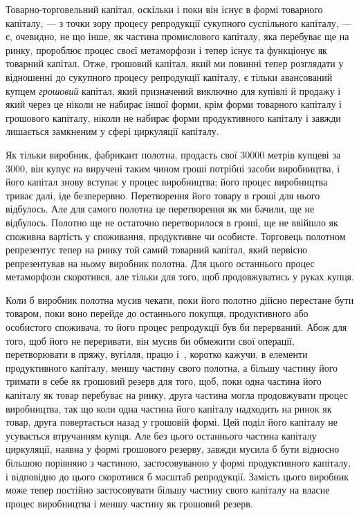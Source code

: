 Товарно-торговельний капітал, оскільки і поки він існує в формі
товарного капіталу, — з точки зору процесу репродукції сукупного суспільного капіталу, — є,
очевидно, не що інше, як
частина промислового капіталу, яка перебуває ще на ринку,
пророблює процес своєї метаморфози і тепер існує та функціонує як товарний капітал. Отже, грошовий
капітал, який ми
повинні тепер розглядати у відношенні до сукупного процесу
репродукції капіталу, є тільки авансований купцем \emph{грошовий}
капітал, який призначений виключно для купівлі й продажу
і який через це ніколи не набирає іншої форми, крім форми товарного капіталу і грошового капіталу,
ніколи не набирає форми
продуктивного капіталу і завжди лишається замкненим у сфері
циркуляції капіталу.

Як тільки виробник, фабрикант полотна, продасть свої \num{30000}
метрів купцеві за 3000, він купує на виручені таким чином гроші потрібні засоби
виробництва, і його капітал
знову вступає у процес виробництва; його процес виробництва
триває далі, іде безперервно. Перетворення його товару в гроші
для нього відбулось. Але для самого полотна це перетворення
як ми бачили, ще не відбулось. Полотно ще не остаточно перетворилося
в гроші, ще не ввійшло як споживна вартість у споживання,
продуктивне чи особисте. Торговець полотном репрезентує
тепер на ринку той самий товарний капітал, який первісно
репрезентував на ньому виробник полотна. Для цього
останнього процес метаморфози скоротився, але тільки для того,
щоб продовжуватись у руках купця.

Коли б виробник полотна мусив чекати, поки його полотно
дійсно перестане бути товаром, поки воно перейде до останнього
покупця, продуктивного або особистого споживача, то
його процес репродукції був би перерваний. Абож для того, щоб
його не переривати, він мусив би обмежити свої операції, перетворювати
в пряжу, вугілля, працю і~, коротко кажучи,
в елементи продуктивного капіталу, меншу частину свого полотна,
а більшу частину його тримати в себе як грошовий резерв
для того, щоб, поки одна частина його капіталу як товар
перебуває на ринку, друга частина могла продовжувати процес
виробництва, так що коли одна частина його капіталу надходить
на ринок як товар, друга повертається назад у грошовій
формі. Цей поділ його капіталу не усувається втручанням купця.
Але без цього останнього частина капіталу циркуляції, наявна
у формі грошового резерву, завжди мусила б бути відносно
більшою порівняно з частиною, застосовуваною у формі продуктивного
капіталу, і відповідно до цього скоротився б масштаб
репродукції. Замість цього виробник може тепер постійно
застосовувати більшу частину свого капіталу на власне процес
виробництва і меншу частину як грошовий резерв.

